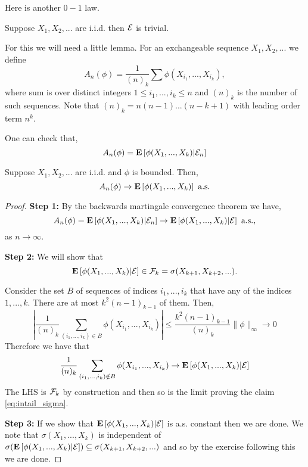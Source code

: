 \documentclass{article}
\begin{document}
Here is another $0-1$ law.
\begin{thm}\label{thm:hewitt_savage}
    Suppose $X_1,X_2,...$ are i.i.d. then $\mathcal E$ is trivial.
\end{thm}

For this we will need a little lemma.
For an exchangeable sequence $X_1,X_2,...$ we define
\begin{equation}
    A_n(\phi)=\frac{1}{(n)_k}\sum\phi(X_{i_1},...,X_{i_k}),
\end{equation}
where sum is over distinct integers $1\leq i_1,...,i_k\leq n$ and $(n)_k$ is the number of such sequences.
Note that $(n)_k=n(n-1)...(n-k+1)$ with leading order term $n^k$.

One can check that,
\begin{equation}
    A_n(\phi)={\mathbf E}\left[\phi(X_1,...,X_k)|\mathcal E_n\right]
\end{equation}
\begin{lem}\label{lem:hewitt_helper}
    Suppose $X_1,X_2,...$ are i.i.d. and $\phi$ is bounded. Then, 
    \begin{equation*}
        A_n(\phi)\rightarrow{\mathbf E}\left[\phi(X_1,...,X_k)\right] \text{ a.s.}
    \end{equation*}
\end{lem}
\begin{proof}
    \textbf{Step 1:} 
    By the backwards martingale convergence theorem we have,
    \begin{equation}
        A_n(\phi)={\mathbf E}\left[\phi(X_1,...,X_k)|\mathcal E_n\right]\rightarrow{\mathbf E}\left[\phi(X_1,...,X_k)|\mathcal E\right] \text{ a.s.},
    \end{equation}
    as $n\rightarrow\infty$.
    
    \textbf{Step 2:} 
    We will show that 
    \begin{equation}\label{eq:intail_sigma}
        {\mathbf E}\left[\phi(X_1,...,X_k)|\mathcal E\right]\in\mathcal F_k=\sigma(X_{k+1},X_{k+2},...).
    \end{equation}

    Consider the set $B$ of sequences of indices $i_1,...,i_k$ that have any of the indices $1,...,k$. 
    There are at most $k^2(n-1)_{k-1}$ of them.
    Then,
    \begin{equation}
        \left|\frac{1}{(n)_k}\sum_{(i_1,...,i_k)\in B}\phi(X_{i_1},...,X_{i_k})\right|\leq \frac{k^2(n-1)_{k-1}}{(n)_k}\lVert\phi\rVert_\infty\rightarrow0
    \end{equation}
    Therefore we have that
    \begin{equation}
        \frac{1}{(n)_k}\sum_{(i_1,...,i_k)\notin B}\phi(X_{i_1},...,X_{i_k})\rightarrow {\mathbf E}\left[\phi(X_1,...,X_k)|\mathcal E\right]
    \end{equation}
    The LHS is $\mathcal F_k$ by construction and then so is the limit proving the claim \ref{eq:intail_sigma}.

    \textbf{Step 3:} If we show that ${\mathbf E}\left[\phi(X_1,...,X_k)|\mathcal E\right]$ is a.s. constant then we are done. 
    We note that $\sigma(X_1,...,X_k)$ is independent of $\sigma({\mathbf E}\left[\phi(X_1,...,X_k)|\mathcal E\right])\subseteq\sigma(X_{k+1},X_{k+2},...)$ and so by the exercise following this we are done.
    
\end{proof}
\end{document}
